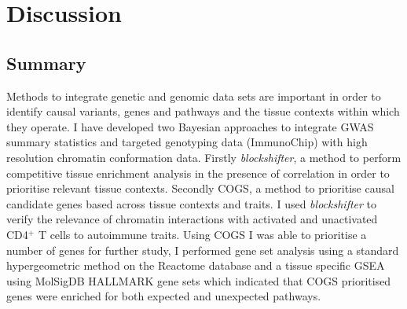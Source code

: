 \documentclass[a4paper,11pt]{report}
\begin{document}
\chapter{Discussion}

\section{Summary} %
Methods to integrate genetic and genomic data sets are important in order to identify causal variants, genes and pathways and the tissue contexts within which they operate. I have developed two Bayesian approaches to integrate GWAS summary statistics and targeted genotyping data (ImmunoChip) with high resolution chromatin conformation data. Firstly \textit{blockshifter}, a method to perform competitive tissue enrichment analysis in the presence of correlation in order to prioritise relevant tissue contexts. Secondly COGS, a method to prioritise causal candidate genes based across tissue contexts and traits.  I used \textit{blockshifter} to verify the relevance of chromatin interactions with activated and unactivated CD4$^{+}$ T cells to autoimmune traits. Using COGS I was able to prioritise a number of genes for further study, I performed gene set analysis using a standard hypergeometric method on the Reactome database and a tissue specific GSEA using MolSigDB HALLMARK gene sets which indicated that COGS prioritised genes  were enriched for both expected and unexpected pathways. 
\end{document}
